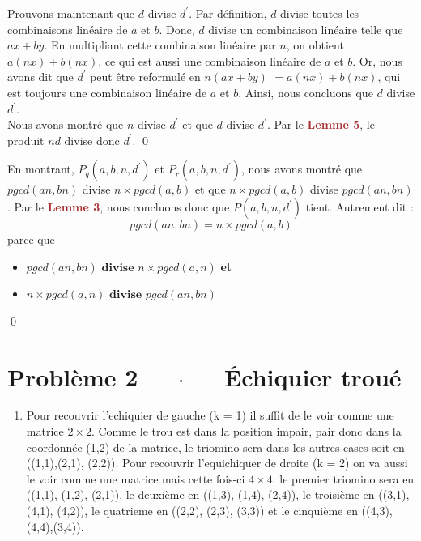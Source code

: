 \documentclass[16pt]{report}
\begin{document}
\begin{multicols*}{2}
\begin{Preuve*}{}{}
        Prouvons maintenant que $d$ divise $d^{\prime}$. Par définition, $d$ divise 
        toutes les combinaisons linéaire de $a$ et $b$. Donc, $d$  divise un combinaison linéaire telle que 
        $ax + by$. En multipliant cette combinaison linéaire par $n$, on obtient $a(nx) + b(nx)$, ce qui est 
        aussi une combinaison linéaire de $a$ et $b$. Or, nous avons dit que $d^{\prime}$ peut être 
        reformulé en \textcolor{myp}{$n(ax + by)$} $ = a(nx) + b(nx)$, qui est toujours 
        une combinaison linéaire de $a$ et $b$. Ainsi, nous concluons que $d$ divise $d^{\prime}$. \vspace{1em} \\ 
        Nous avons montré que $n$ divise $d^{\prime}$ et que $d$ divise $d^{\prime}$. 
        Par le \textbf{\textcolor{brown}{Lemme 5}}, le produit $nd$ divise donc $d^{\prime}$. \qed   
    \end{Preuve*}


    En montrant, $P_q(a,b, n, d^{\prime})$ et $P_r(a,b, n, d^{\prime})$, nous avons montré que 
    $pgcd(an, bn)$ divise $n\times pgcd(a,b)$ et que $n \times pgcd(a, b)$ divise $pgcd(an, bn)$. 
    Par le \textbf{\textcolor{brown}{Lemme 3}}, nous concluons donc que $P(a,b,n, d^{\prime})$ tient. 
    Autrement dit : 
    \[ pgcd(an, bn) =  n \times pgcd(a, b) \]
    parce que 
    \begin{itemize}
        \item $pgcd(an, bn) \textbf{ divise }  n\times pgcd(a,n)$ \textbf{et} \\ 
        \item $n\times pgcd(a,n) \textbf{ divise } pgcd(an, bn)$
    \end{itemize}
    \qed
    \section*{Problème 2 $\quad$ $\cdot$  $\quad$ Échiquier troué}
  \begin{enumerate}

    \item
    Pour recouvrir l'echiquier de gauche (k = 1) il suffit de le voir comme une matrice $2 \times 2$. Comme le trou est dans la position impair, pair donc dans la coordonnée (1,2) de la matrice, le triomino sera dans les autres cases soit en ((1,1),(2,1), (2,2)).
    Pour recouvrir l'equichiquer de droite (k = 2) on va aussi le voir comme une matrice mais cette fois-ci $4 \times 4$. le premier triomino sera en ((1,1), (1,2), (2,1)), le deuxième en ((1,3), (1,4), (2,4)), le troisième en ((3,1), (4,1), (4,2)), le quatrieme en ((2,2), (2,3), (3,3)) et le cinquième en ((4,3),(4,4),(3,4)).
    

\end{enumerate}
\end{multicols*}
\end{document}
